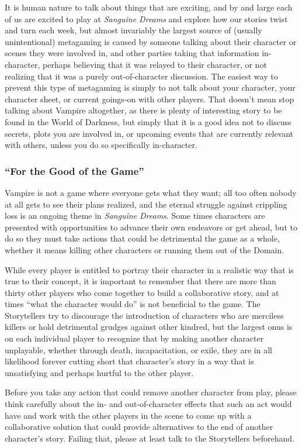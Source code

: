 It is human nature to talk about things that are exciting, and by and large each of us are excited to play at 
\emph{Sanguine Dreams} and explore how our stories twist and turn each week, but almost invariably the largest 
source of (usually unintentional) metagaming is caused by someone talking about their character or scenes they 
were involved in, and other parties taking that information in-character, perhaps believing that it was relayed 
to their character, or not realizing that it was a purely out-of-character discussion.  The easiest way to prevent 
this type of metagaming is simply to not talk about your character, your character sheet, or current goings-on 
with other players.  That doesn't mean stop talking about Vampire altogether, as there is plenty of interesting 
story to be found in the World of Darkness, but simply that it is a good idea not to discuss secrets, plots you are 
involved in, or upcoming events that are currently relevant with others, unless you do so specifically in-character.

\subsubsection{``For the Good of the Game''}
Vampire is not a game where everyone gets what they want; all too often nobody at all gets to see their plans 
realized, and the eternal struggle against crippling loss is an ongoing theme in \emph{Sanguine Dreams}.  
Some times characters are presented with opportunities to advance their own endeavors or get ahead, but to do so 
they must take actions that could be detrimental the game as a whole, whether it means killing other characters 
or running them out of the Domain.

While every player is entitled to portray their character in a realistic way that is true to their concept, 
it is important to remember that there are more than thirty other players who come together to build a 
collaborative story, and at times ``what the character would do'' is not beneficial to the game.  The 
Storytellers try to discourage the introduction of characters who are merciless killers or hold detrimental grudges 
against other kindred, but the largest onus is on each individual player to recognize that by making another character 
unplayable, whether through death, incapacitation, or exile, they are in all likelihood forever cutting short 
that character's story in a way that is unsatisfying and perhaps hurtful to the other player.

Before you take any action that could remove another character from play, please think carefully about the 
in- and out-of-character effects that such an act would have and work with the other players in the 
scene to come up with a collaborative solution that could provide alternatives to the end of another character's 
story.  Failing that, please at least talk to the Storytellers beforehand.


